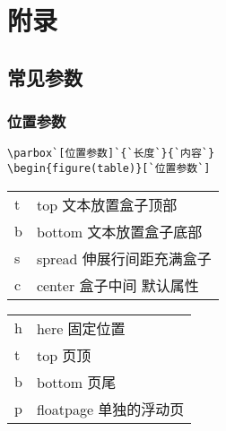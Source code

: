 \chapter{附\qquad 录}
\thispagestyle{fancy}   

\section{常见参数}

\subsection{位置参数}
\begin{lstlisting}[language={[LaTeX]TeX}]
\parbox`[位置参数]`{`长度`}{`内容`}
\begin{figure(table)}[`位置参数`]
\end{lstlisting}


\begin{tabular}{ll}

  t & top 文本放置盒子顶部 \\
  b & bottom 文本放置盒子底部 \\
  s & spread 伸展行间距充满盒子 \\
  c & center 盒子中间 \textcolor[rgb]{0.00,0.00,1.00}{默认属性} \\

\end{tabular}


\begin{tabular}{ll}

  h & here 固定位置 \\
  t & top 页顶 \\
  b & bottom 页尾 \\
  p & floatpage 单独的浮动页 \\
\end{tabular}

